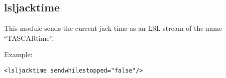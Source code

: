 \subsection{lsljacktime}\label{sec:lsljacktime}

This module sends the current jack time as an LSL stream of the name ``TASCARtime''.

Example:
\begin{lstlisting}[numbers=none]
<lsljacktime sendwhilestopped="false"/>
\end{lstlisting}


